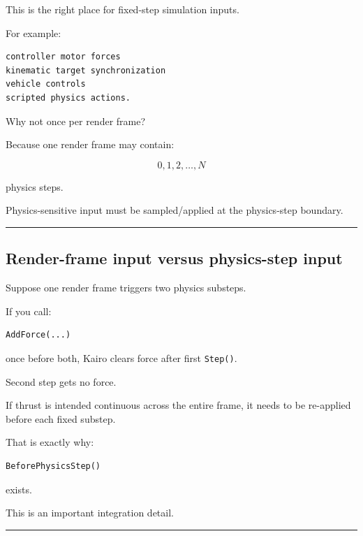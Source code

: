 This is the right place for fixed-step simulation inputs.

For example:

\begin{verbatim}
controller motor forces
kinematic target synchronization
vehicle controls
scripted physics actions.
\end{verbatim}

Why not once per render frame?

Because one render frame may contain:

\[
0,1,2,\dots,N
\]

physics steps.

Physics-sensitive input must be sampled/applied at the physics-step boundary.

\begin{center}\rule{0.5\linewidth}{0.5pt}\end{center}

\subsection{Render-frame input versus physics-step input}\label{06-engine-ii-ch037-render-frame-input-versus-physics-step-input}

\hypertarget{06-engine-ii-ch037-render-frame-input-versus-physics-step-input}{}

Suppose one render frame triggers two physics substeps.

If you call:

\begin{verbatim}
AddForce(...)
\end{verbatim}

once before both, Kairo clears force after first \texttt{Step()}.

Second step gets no force.

If thrust is intended continuous across the entire frame, it needs to be re-applied before each fixed substep.

That is exactly why:

\begin{verbatim}
BeforePhysicsStep()
\end{verbatim}

exists.

This is an important integration detail.

\begin{center}\rule{0.5\linewidth}{0.5pt}\end{center}

